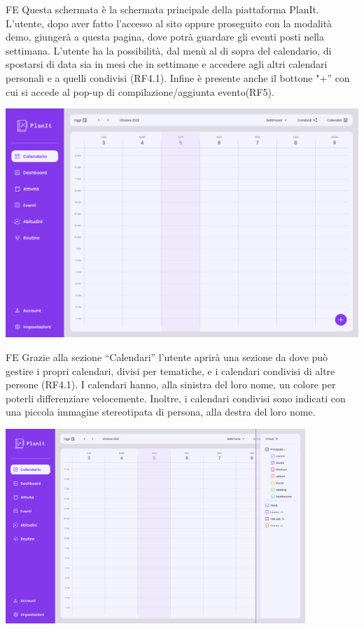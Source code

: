 \begin{listaPersonale}{FE}
     Questa schermata è la schermata principale della piattaforma PlanIt. L’utente, dopo aver fatto l’accesso al sito oppure proseguito con la modalità demo, giungerà a questa pagina, dove potrà guardare gli eventi posti nella settimana. L’utente ha la possibilità, dal menù al di sopra del calendario, di spostarsi di data sia in mesi che in settimane e accedere agli altri calendari personali e a quelli condivisi (RF4.1). Infine è presente anche il bottone "+” con cui si accede al pop-up di compilazione/aggiunta evento(RF5).
    \begin{center}
        \includegraphics[width=1\textwidth]{img/FrontEnd/Calendar/Calendar.png}
    \end{center}
    
    \begin{listaPersonale2}{FE}
         Grazie alla sezione “Calendari” l’utente aprirà una sezione da dove può gestire i propri calendari, divisi per tematiche, e i calendari condivisi di altre persone (RF4.1). I calendari hanno, alla sinistra del loro nome, un colore per poterli differenziare velocemente. Inoltre, i calendari condivisi sono indicati con una piccola immagine stereotipata di persona, alla destra del loro nome.
    \end{listaPersonale2}
    \begin{center}
        \includegraphics[width=0.85\textwidth,height=0.30\textheight]{img/FrontEnd/Calendar/CalendarCondivisi.png}
    \end{center}
    

\end{listaPersonale}
